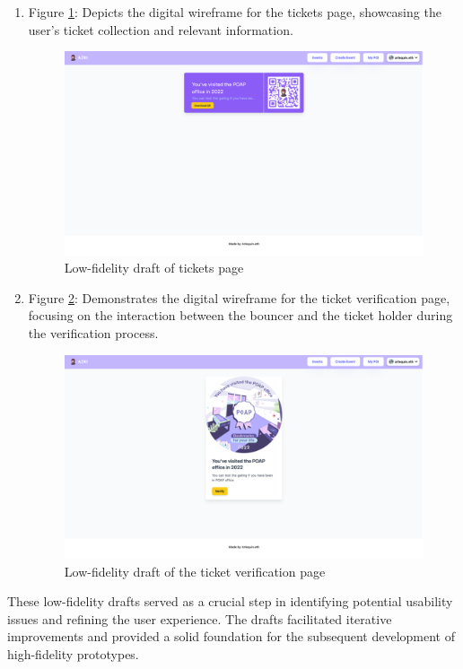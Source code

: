 \begin{enumerate}
\item Figure \ref{Abb9}: Depicts the digital wireframe for the tickets page, showcasing the user's ticket collection and relevant information.\\
\begin{figure}[H]
\centering
\includegraphics[width=1\linewidth]{PICs/LowFiTicket.png}
\caption{Low-fidelity draft of tickets page}\label{Abb9}
\end{figure}

\item Figure \ref{Abb10}: Demonstrates the digital wireframe for the ticket verification page, focusing on the interaction between the bouncer and the ticket holder during the verification process.\\
\begin{figure}[H]
\centering
\includegraphics[width=1\linewidth]{PICs/LowFiVerification.png}
\caption{Low-fidelity draft of the ticket verification page}\label{Abb10}
\end{figure}
\end{enumerate}

These low-fidelity drafts served as a crucial step in identifying potential usability issues and refining the user experience. The drafts facilitated iterative improvements and provided a solid foundation for the subsequent development of high-fidelity prototypes.

